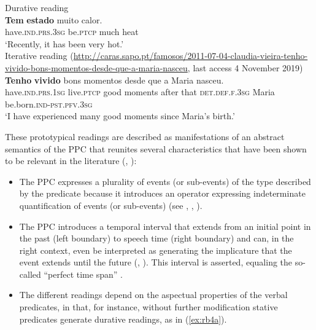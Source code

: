 \documentclass[output=paper,colorlinks,citecolor=brown]{langscibook}
\begin{document}
\ea
    \ea\label{ex:rb4a} Durative reading \parencite[180]{Hundertmark-SantosMartins1982}\\
     \gll   \textbf{Tem} \textbf{estado} muito calor.\\
            have.\textsc{ind.prs.3sg} be.\textsc{ptcp} much heat\\
     \glt ‘Recently, it has been very hot.’\\
    \ex\label{ex:rb4b} Iterative reading (\url{http://caras.sapo.pt/famosos/2011-07-04-claudia-vieira-tenho-vivido-bons-momentos-desde-que-a-maria-nasceu}, last access 4 November 2019)\\
     \gll   \textbf{Tenho} \textbf{vivido} bons momentos desde que a Maria nasceu.\\
            have.\textsc{ind.prs.1sg} live.\textsc{ptcp} good moments after that \textsc{det.def.f.3sg} Maria be.born.\textsc{ind-pst.pfv.3sg}\\
     \glt ‘I have experienced many good moments since Maria’s birth.’
    \z
\z

These prototypical readings are described as manifestations of an abstract semantics of the PPC that reunites several characteristics that have been shown to be relevant in the literature (\cite{Ilari1999,Ilari2001a,Ilari2001b}, \cite{Barbosa2008, Schmitt2010, Molsing2010, CabredoHofherrCarvalho2010, Barbosa2012, AmaralHowe2012, OliveiraLeal2012, Olbertz2018, Becker2020}):

\begin{itemize}
    \item The PPC expresses a plurality of events (or sub-events) of the type described by the predicate because it introduces an operator expressing indeterminate quantification of events (or sub-events) (see \cite[98]{Barbosa2008}, \cite[182]{Barbosa2012}, \cite{Becker2020}).
    \item The PPC introduces a temporal interval that extends from an initial point in the past (left boundary) to speech time (right boundary) and can, in the right context, even be interpreted as generating the implicature that the event extends until the future (\cite[32]{Becker2017}, \cite[489]{Olbertz2018}). This interval is asserted, equaling the so-called “perfect time span” \parencite[see, for instance,][]{Stechow1999}.
    \item The different readings depend on the aspectual properties of the verbal predicates, in that, for instance, without further modification stative predicates generate durative readings, as in (\ref{ex:rb4a}).
\end{itemize}
\end{document}
